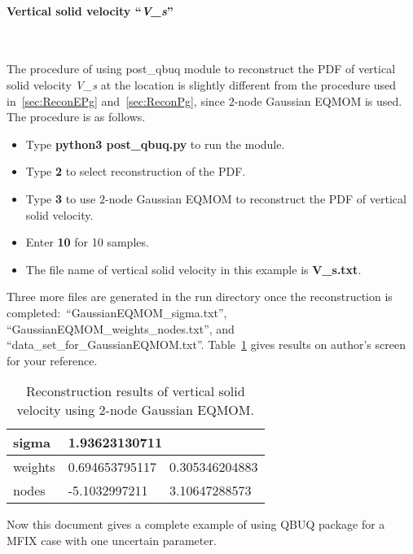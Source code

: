 \documentclass[a4paper,12pt,titlepage]{article}
\begin{document}
\paragraph{Vertical solid velocity ``\emph{V\_s}''}\mbox{}\\
\label{sec:ReconVs}

The procedure of using post\_qbuq module to reconstruct the PDF of vertical
solid velocity \emph{V\_s} at the location is slightly different from the 
procedure used in~\ref{sec:ReconEPg} and~\ref{sec:ReconPg}, since $2$-node
Gaussian EQMOM is used\cite{Chalons2010}. The procedure is as follows.

\begin{itemize}
 \item Type \textbf{python3 post\_qbuq.py} to run the module.
 \item Type \textbf{2} to select reconstruction of the PDF.
 \item Type \textbf{3} to use $2$-node Gaussian EQMOM to reconstruct the PDF of 
 vertical solid velocity.
 \item Enter \textbf{10} for 10 samples.
 \item The file name of vertical solid velocity in this example is 
 \textbf{V\_s.txt}.
\end{itemize}

Three more files are generated in the run directory once the reconstruction is
completed:\ ``GaussianEQMOM\_sigma.txt'', ``GaussianEQMOM\_weights\_nodes.txt'', 
and ``data\_set\_for\_GaussianEQMOM.txt''. Table~\ref{tab:ReconVs} gives results 
on author's screen for your reference.

\begin{table}[htp]
 \centering
 \begin{tabular}{l|ll} \hline
  sigma   & \multicolumn{2}{l}{1.93623130711} \\ \hline
  weights & 0.694653795117 & 0.305346204883   \\ \hline
  nodes   & -5.1032997211  & 3.10647288573    \\ \hline
 \end{tabular}
 \caption{Reconstruction results of vertical solid velocity using $2$-node 
 Gaussian EQMOM.}
 \label{tab:ReconVs}
\end{table}

Now this document gives a complete example of using QBUQ package for a MFIX case
with one uncertain parameter.





\end{document}
